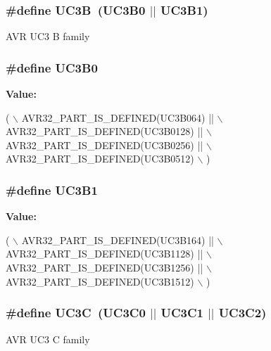 \subsubsection[{U\+C3\+B}]{\setlength{\rightskip}{0pt plus 5cm}\#define U\+C3\+B~(U\+C3\+B0 $\vert$$\vert$ U\+C3\+B1)}\label{group__uc3__part__macros__group_ga61e51606324c212eb11079e5acf592e0}
A\+V\+R U\+C3 B family \hypertarget{group__uc3__part__macros__group_ga701194230718f73a89efc39742e061af}{}
\subsubsection[{U\+C3\+B0}]{\setlength{\rightskip}{0pt plus 5cm}\#define U\+C3\+B0}\label{group__uc3__part__macros__group_ga701194230718f73a89efc39742e061af}
{\bfseries Value\+:}
\begin{DoxyCode}
(   \(\backslash\)
        AVR32\_PART\_IS\_DEFINED(UC3B064)  || \(\backslash\)
        AVR32\_PART\_IS\_DEFINED(UC3B0128) || \(\backslash\)
        AVR32\_PART\_IS\_DEFINED(UC3B0256) || \(\backslash\)
        AVR32\_PART\_IS\_DEFINED(UC3B0512) \(\backslash\)
        )
\end{DoxyCode}
\hypertarget{group__uc3__part__macros__group_ga96602eec1c923afe92a64d807a242cd7}{}
\subsubsection[{U\+C3\+B1}]{\setlength{\rightskip}{0pt plus 5cm}\#define U\+C3\+B1}\label{group__uc3__part__macros__group_ga96602eec1c923afe92a64d807a242cd7}
{\bfseries Value\+:}
\begin{DoxyCode}
(   \(\backslash\)
        AVR32\_PART\_IS\_DEFINED(UC3B164)  || \(\backslash\)
        AVR32\_PART\_IS\_DEFINED(UC3B1128) || \(\backslash\)
        AVR32\_PART\_IS\_DEFINED(UC3B1256) || \(\backslash\)
        AVR32\_PART\_IS\_DEFINED(UC3B1512) \(\backslash\)
        )
\end{DoxyCode}
\hypertarget{group__uc3__part__macros__group_gac7a13b9ceb67804d94b6a8967512ee71}{}
\subsubsection[{U\+C3\+C}]{\setlength{\rightskip}{0pt plus 5cm}\#define U\+C3\+C~(U\+C3\+C0 $\vert$$\vert$ U\+C3\+C1 $\vert$$\vert$ U\+C3\+C2)}\label{group__uc3__part__macros__group_gac7a13b9ceb67804d94b6a8967512ee71}
A\+V\+R U\+C3 C family \hypertarget{group__uc3__part__macros__group_ga4519bacce7868e73227b94af6e2a1b7f}{}
